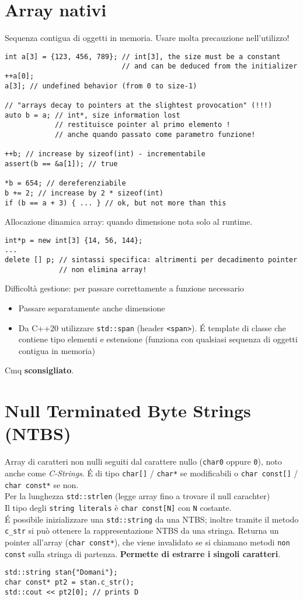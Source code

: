\documentclass[10pt, oneside]{Book}
\begin{document}
\section{Array nativi}
Sequenza contigua di oggetti in memoria. Usare molta precauzione nell'utilizzo!
\begin{verbatim}
int a[3] = {123, 456, 789}; // int[3], the size must be a constant
                            // and can be deduced from the initializer
++a[0];
a[3]; // undefined behavior (from 0 to size-1)

// "arrays decay to pointers at the slightest provocation" (!!!)
auto b = a; // int*, size information lost
            // restituisce pointer al primo elemento !
            // anche quando passato come parametro funzione!
            
++b; // increase by sizeof(int) - incrementabile
assert(b == &a[1]); // true

*b = 654; // dereferenziabile
b += 2; // increase by 2 * sizeof(int)
if (b == a + 3) { ... } // ok, but not more than this
\end{verbatim}
Allocazione dinamica array: quando dimensione nota solo al runtime.
\begin{verbatim}
int*p = new int[3] {14, 56, 144};
...
delete [] p; // sintassi specifica: altrimenti per decadimento pointer
             // non elimina array!
\end{verbatim}
Difficoltà gestione: per passare correttamente a funzione necessario
\begin{itemize}
\item Passare separatamente anche dimensione
\item Da C++20 utilizzare \texttt{std::span} (header \texttt{<span>}). \'E template di classe che contiene tipo elementi e estensione (funziona con qualsiasi sequenza di oggetti contigua in memoria)
\end{itemize}
Cmq \textbf{sconsigliato}.

\section{Null Terminated Byte Strings (NTBS)}
Array di caratteri non nulli seguiti dal carattere nullo (\texttt{char{0}} oppure \texttt{0}), noto anche come \textit{C-Strings}. \'E di tipo \texttt{char[]} / \texttt{char*} se modificabili o \texttt{char const[]} / \texttt{char const*} se non. 
\\Per la lunghezza \texttt{std::strlen} (legge array fino a trovare il null carachter)
\\Il tipo degli \texttt{string literals} è \texttt{char const[N]} con \texttt{N} costante. 
\\\'E possibile inizializzare una \texttt{std::string} da una NTBS; inoltre tramite il metodo \texttt{c\_str} si può ottenere la rappresentazione NTBS da una stringa. Returna un pointer all'array (\texttt{char const*}), che viene invalidato se si chiamano metodi \texttt{non const} sulla stringa di partenza. \textbf{Permette di estrarre i singoli caratteri}.
\begin{verbatim}
std::string stan{"Domani"};
char const* pt2 = stan.c_str();
std::cout << pt2[0]; // prints D
\end{verbatim}
\end{document}
